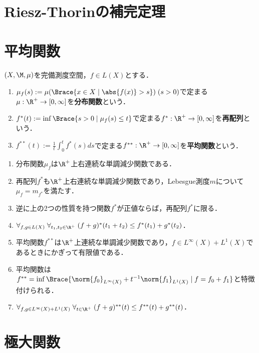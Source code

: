 \documentclass[uplatex,dvipdfmx]{jsreport}
\begin{document}
\section{Riesz-Thorinの補完定理}

\section{平均関数}

\begin{definition}
    $(X,\M,\mu)$を完備測度空間，$f\in L(X)$とする．
    \begin{enumerate}
        \item $\mu_f(s):=\mu(\Brace{x\in X\mid\abs{f(x)}>s})\;(s>0)$で定まる$\mu:\R^+\to[0,\infty]$を\textbf{分布関数}という．
        \item $f^*(t):=\inf\Brace{s>0\mid\mu_f(s)\le t}$で定まる$f^*:\R^+\to[0,\infty]$を\textbf{再配列}という．
        \item $f^{**}(t):=\frac{1}{t}\int^t_0f^*(s)ds$で定まる$f^{**}:\R^+\to[0,\infty]$を\textbf{平均関数}という．
    \end{enumerate}
\end{definition}

\begin{theorem}\mbox{}
    \begin{enumerate}
        \item 分布関数$\mu_f$は$\R^+$上右連続な単調減少関数である．
        \item 再配列$f^*$も$\R^+$上右連続な単調減少関数であり，Lebesgue測度$m$について$\mu_f=m_{f^*}$を満たす．
        \item 逆に上の2つの性質を持つ関数$f^*$が正値ならば，再配列$f^*$に限る．
        \item $\forall_{f,g\in L(X)}\;\forall_{t_1,t_2\in\R^+}\;(f+g)^*(t_1+t_2)\le f^*(t_1)+g^*(t_2)$．
        \item 平均関数$f^{**}$は$\R^+$上連続な単調減少関数であり，$f\in L^\infty(X)+L^1(X)$であるときにかぎって有限値である．
        \item 平均関数は$f^{**}=\inf\Brace{\norm{f_0}_{L^\infty(X)}+t^{-1}\norm{f_1}_{L^1(X)}\mid f=f_0+f_1}$と特徴付けられる．
        \item $\forall_{f,g\in L^\infty(X)+L^1(X)}\;\forall_{t\in\R^+}\;(f+g)^{**}(t)\le f^{**}(t)+g^{**}(t)$．
    \end{enumerate}
\end{theorem}

\section{極大関数}
\end{document}
